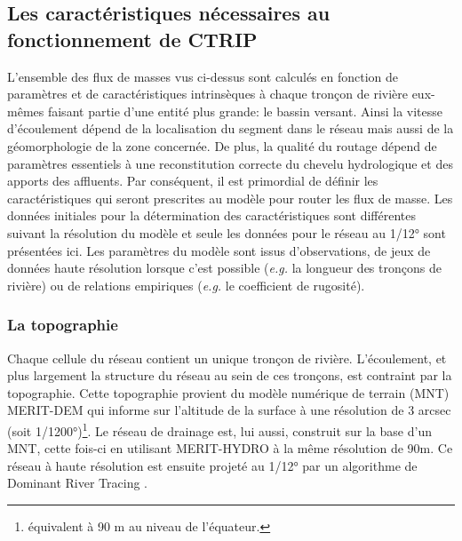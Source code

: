 \subsection{\selectfont Les caractéristiques nécessaires au fonctionnement de CTRIP}
\label{sec:ctrip_caracteristique}
L'ensemble des flux de masses vus ci-dessus sont calculés en fonction de paramètres et de caractéristiques intrinsèques à chaque tronçon de rivière eux-mêmes faisant partie d'une entité plus grande: le bassin versant. Ainsi la vitesse d'écoulement dépend de la localisation du segment dans le réseau mais aussi de la géomorphologie de la zone concernée. De plus, la qualité du routage dépend de paramètres essentiels à une reconstitution correcte du chevelu hydrologique et des apports des affluents. Par conséquent, il est primordial de définir les caractéristiques qui seront prescrites au modèle pour router les flux de masse. Les données initiales pour la détermination des caractéristiques sont différentes suivant la résolution du modèle et seule les données pour le réseau au 1/12° sont présentées ici. Les paramètres du modèle sont issus d'observations, de jeux de données haute résolution lorsque c'est possible (\textit{e.g.} la longueur des tronçons de rivière) ou de relations empiriques (\textit{e.g.} le coefficient de rugosité).

\subsubsection{\selectfont La topographie}

Chaque cellule du réseau contient un unique tronçon de rivière. L'écoulement, et plus largement la structure du réseau au sein de ces tronçons, est contraint par la topographie. Cette topographie provient du modèle numérique de terrain (MNT) MERIT-DEM \citep[accessible à: \url{http://hydro.iis.u-tokyo.ac.jp/~yamadai/MERIT_DEM/ ,}][]{yamazaki2017} qui informe sur l'altitude de la surface à une résolution de 3 arcsec (soit 1/1200°)\footnote{équivalent à 90 m au niveau de l'équateur.}. Le réseau de drainage est, lui aussi, construit sur la base d'un MNT, cette fois-ci en utilisant MERIT-HYDRO \citep[accessible à: \url{http://hydro.iis.u-tokyo.ac.jp/~yamadai/MERIT_Hydro/}][]{yamazaki2019} à la même résolution de 90m. Ce réseau à haute résolution est ensuite projeté au 1/12° par un algorithme de Dominant River Tracing \citep{wu2011, wu2012}.\\

